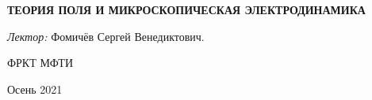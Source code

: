 \begin{titlepage}
	\begin{center}
		\vspace*{1cm}
		{\bf \Huge ТЕОРИЯ ПОЛЯ И МИКРОСКОПИЧЕСКАЯ ЭЛЕКТРОДИНАМИКА}
		\begin{figure}[h]
			\noindent {}
		\end{figure}
		\vspace*{1cm}
		
		{\large {\it Лектор:} Фомичёв Сергей Венедиктович.}

		
		
		
		\vfill
		
		
		ФРКТ МФТИ
		
		Осень 2021
		
		\vspace{1cm}
	\end{center}
\end{titlepage}
